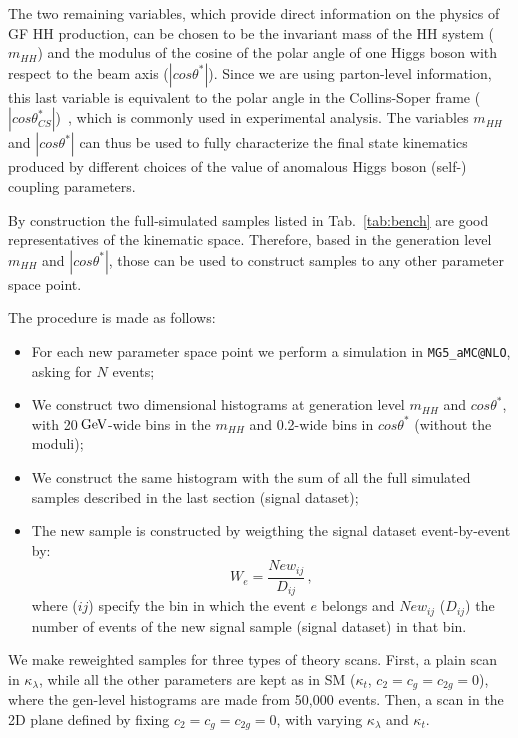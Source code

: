 The two remaining variables, which provide direct information on the physics of GF HH production, can be chosen to be the invariant mass of the HH system ($m_{HH}$) and the modulus of the cosine of the  polar angle of one Higgs boson with respect to the beam axis ($|cos\theta^*|$). Since we are using parton-level information, this last variable is equivalent to the polar angle in the Collins-Soper frame ($|cos\theta^*_{CS}|$)~\cite{PhysRevD.16.2219}, which is commonly used in experimental analysis. The variables $m_{HH}$ and $|cos\theta^*|$ can thus be used to fully characterize the final state kinematics produced by different choices of the value of anomalous Higgs boson (self-) coupling parameters.

By construction the full-simulated samples listed in Tab.~\ref{tab:bench}  are good representatives of the kinematic space. 
Therefore, based in the generation level $m_{HH}$ and $|cos\theta^*|$, those can be used to construct 
samples to any other parameter space point. 

The procedure is made as follows: 
\begin{itemize}
\item For each new parameter space point we perform 
a simulation in {\tt MG5\_aMC@NLO}, asking for $N$ events;
\item We construct two dimensional histograms at generation level $m_{HH}$ and $cos\theta^*$, with 20$\,\text{Ge\hspace{-.08em}V}$-wide bins in the $m_{HH}$ and 0.2-wide bins in $cos\theta^*$ (without the moduli);
\item We construct the same histogram with the sum of all the full simulated samples described in the last section (signal dataset);
\item The new sample is constructed by weigthing the signal dataset event-by-event by:
 \begin{equation}
 W_{e} = \frac{New_{ij}}{D_{ij}}\,,
 \end{equation}
 where ($ij$) specify the bin in which the event $e$ belongs and $New_{ij}$ ($D_{ij}$) the number of events of the 
 new signal sample (signal dataset) in that bin. 
 \end{itemize}
 
 We make reweighted samples for three types of theory scans. 
 First, a plain scan in $\kappa_{\lambda}$, while all the other parameters are kept as in SM ($\kappa_{t}$, $c_2 = c_g  = c_{2g} =0$), where the gen-level histograms are made from 50,000 events. 
 Then, a scan in the 2D plane defined by fixing  $c_2 = c_g  = c_{2g} =0$, with varying $\kappa_{\lambda}$ and $\kappa_{t}$. 

